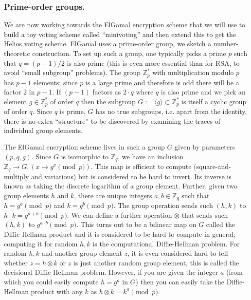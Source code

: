 \documentclass{llncs}
\begin{document}
\subsubsection{Prime-order groups.}
We are now working towards the ElGamal encryption scheme that we will use to
build a toy voting scheme called ``minivoting'' and then extend this to get the
Helios voting scheme. ElGamal uses a prime-order group, we sketch a
number-theoretic construction. To set up such a group, one typically picks a
prime $p$ such that $q = (p-1)/2$ is also prime (this is even more essential
than for RSA, to avoid ``small subgroup'' problems). The group $\mathbb Z^*_p$
with multiplication modulo $p$ has $p - 1$ elements; since $p$ is a large prime
and therefore is odd there will be a factor $2$ in $p-1$. If $(p-1)$ factors as
$2 \cdot q$ where $q$ is also prime and we pick an element $g \in \mathbb Z^*_p$
of order $q$ then the subgroup $G := \langle g \rangle \subset \mathbb Z^*_p$ is
itself a cyclic group of order $q$. Since $q$ is prime, $G$ has no true
subgroups, i.e. apart from the identity, there is no extra ``structure'' to be
discovered by examining the traces of individual group elements\footnotemark.

The ElGamal encryption scheme lives in such a group $G$ given by parameters $(p,
q, g)$. Since $G$ is isomorphic to $\mathbb Z_q$, we have an inclusion $\mathbb
Z_q \to G, (x \mapsto g^x \pmod{p})$. This map is efficient to compute
(square-and-multiply and variations) but is considered to be hard to invert. Its
inverse is known as taking the discrete logarithm of a group element. Further,
given two group elements $h$ and $k$, there are unique integers $a, b \in
\mathbb Z_q$ such that $h = g^a \pmod{p}$ and $k = g^b \pmod{p}$. The group
operation sends such $(h, k)$ to $h \cdot k = g^{a + b} \pmod{p}$. We can define
a further operation $\otimes$ that sends such $(h, k)$ to $g^{a \cdot b}
\pmod{p}$. This turns out to be a bilinear map on $G$ called the Diffie-Hellman
product and it is considered to be hard to compute in general; computing it for
random $h, k$ is the computational Diffie-Hellman problem. For random $h, k$ and
another group element $z$, it is even considered hard to tell whether $z = h
\otimes k$ or $z$ is just another random group element, this is called the
decisional Diffie-Hellman problem. However, if you are given the integer $a$
(from which you could easily compute $h = g^a$ in $G$) then you can easily take
the Diffie-Hellman product with any $k$ as $h \otimes k = k^a \pmod{p}$.
\end{document}
